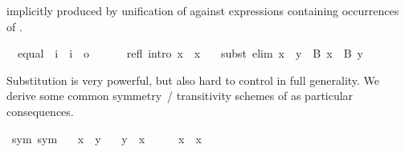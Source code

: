 \begin{isabellebody}
\begin{isamarkuptext}
  implicitly produced by unification of  against
  expressions containing occurrences of .%
\end{isamarkuptext}%
\isamarkuptrue%
\isamarkupfalse%
\isanewline
\ \ equal\ {}{}\ {}i\ {}\ i\ {}\ o{}\ \ {}\ {}{}{}\ {}{}{}\isanewline
{}\isanewline
\ \ refl\ {}intro{}{}\ {}x\ {}\ x{}\ \isanewline
\ \ subst\ {}elim{}{}\ {}x\ {}\ y\ {}\ B\ x\ {}\ B\ y{}%
\begin{isamarkuptext}%
\noindent Substitution is very powerful, but also hard to control in
  full generality.  We derive some common symmetry~/ transitivity
  schemes of  as particular consequences.%
\end{isamarkuptext}%
\isamarkuptrue%
\isamarkupfalse%
\ sym\ {}sym{}{}\isanewline
\ \ \ {}x\ {}\ y{}\isanewline
\ \ \ {}y\ {}\ x{}\isanewline
%
\isadelimproof
%
\endisadelimproof
%
\isatagproof
{}\isamarkupfalse%
\ {}\isanewline
\ \ \isamarkupfalse%
\ {}x\ {}\ x{}\ \isamarkupfalse%

\end{isabellebody}
